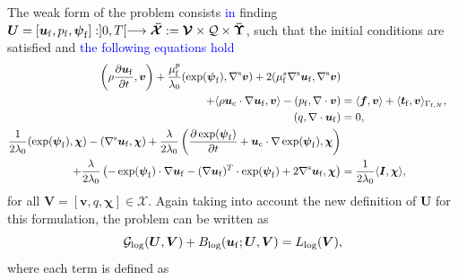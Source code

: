 \documentclass[11pt,english]{article}
\def\ufluid{\boldsymbol{u}_{\rm{f}}}
\def\pfluid{p_{\rm{f}}}
\def\psifluid{\boldsymbol{\psi}_{\rm{f}}}
\def\viscs{\mu^{s}_{\rm{f}}}
\def\viscp{\mu^{p}_{\rm{f}}}
\def\alevelocity{\boldsymbol{u}_{\mathrm{c}}}
\begin{document}
The weak form of the problem consists \textcolor{blue}{in} finding $\boldsymbol{U}=[\ufluid,\pfluid,\psifluid]:]0,T[\longrightarrow\boldsymbol{\bar{\mathcal{X}}}:=\boldsymbol{\mathcal{V}}\times\mathcal{Q}\times\boldsymbol{\bar{\Upsilon}}$, such that the initial conditions are satisfied and \textcolor{blue}{the following equations hold}
\begin{align*}
    \left(\rho\dfrac{\partial\ufluid}{\partial t},\boldsymbol{v}\right)+\dfrac{\viscp}{\lambda_{0}}(\exp(\psifluid),\nabla^{\rm s}\boldsymbol{v})+2(\viscs\nabla^{\rm s}\ufluid,\nabla^{\rm s}\boldsymbol{v})\nonumber \\
    +\langle\rho \alevelocity\cdot\nabla\ufluid,\boldsymbol{v}\rangle-(\pfluid,\nabla\cdot\boldsymbol{v}) & =\langle\boldsymbol{f},\boldsymbol{v}\rangle
    + \langle\boldsymbol{t}_{\rm f},\boldsymbol{v}\rangle_{\Gamma_{{\rm f} , N}}, \\ %
    (q,\nabla\cdot\ufluid) & =0, \\ %
    \dfrac{1}{2\lambda_{0}}(\exp(\psifluid),\boldsymbol{\chi})-(\nabla^{\rm s}\ufluid,\boldsymbol{\chi})+\dfrac{\lambda}{2\lambda_{0}}\left(\frac{\partial\exp(\psifluid)}{\partial t}+\alevelocity\cdot\nabla\exp(\psifluid),\boldsymbol{\chi}\right)\\ %
    +\dfrac{\lambda}{2\lambda_{0}}\left(-\exp(\psifluid)\cdot\nabla\ufluid-(\nabla\ufluid)^{T}\cdot\exp(\psifluid)+2\nabla^{\rm s}\ufluid,\boldsymbol{\chi}\right) & =\dfrac{1}{2\lambda_{0}}\langle\boldsymbol{I},\boldsymbol{\chi}\rangle,  %
\end{align*}
for all $\boldsymbol{V}=[\boldsymbol{v},q,\boldsymbol{\chi}]\in\boldsymbol{\mathcal{X}}$. Again taking into account the new definition of $\boldsymbol{U}$ for this formulation, the problem can be written as 
\begin{equation}
\mathcal{G}_{\text{log}}(\boldsymbol{U},\boldsymbol{V})+B_{\text{log}}(\ufluid;\boldsymbol{U},\boldsymbol{V})=L_{\text{log}}(\boldsymbol{V}),\label{eq:VarCompactLOG}
\end{equation}
where each term is defined as 
\end{document}
